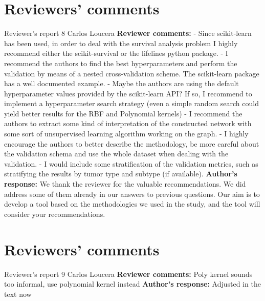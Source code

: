 \documentclass{bmcart}
\begin{document}
\begin{backmatter}
\section*{Reviewers' comments}
\newline Reviewer's report 8
\newline Carlos Loucera
\newline \textbf{Reviewer comments:}
- Since scikit-learn has been used, in order to deal with the survival analysis problem I highly recommend either the scikit-survival or the lifelines python package. 
- I recommend the authors to find the best hyperparameters and perform the validation by means of a nested cross-validation scheme. The scikit-learn package has a well documented example. 
- Maybe the authors are using the default hyperparameter values provided by the scikit-learn API? If so, I recommend to implement a hyperparameter search strategy (even a simple random search could yield better results for the RBF and Polynomial kernels) 
- I recommend the authors to extract some kind of interpretation of the constructed network with some sort of unsupervised learning algorithm working on the graph. 
- I highly encourage the authors to better describe the methodology, be more careful about the validation schema and use the whole dataset when dealing with the validation. 
- I would include some stratification of the validation metrics, such as stratifying the results by tumor type and subtype (if available).
\newline \textbf{Author's response:}
 We thank the reviewer for the valuable recommendations. We did address some of them already in our answers to previous questions. Our aim is to develop a tool based on the methodologies we used in the study, and the tool will consider your recommendations. 



\section*{Reviewers' comments}
\newline Reviewer's report 9
\newline Carlos Loucera
\newline \textbf{Reviewer comments:}
Poly kernel sounds too informal, use polynomial kernel instead
\newline \textbf{Author's response:}
Adjusted in the text now



\end{backmatter}
\end{document}
